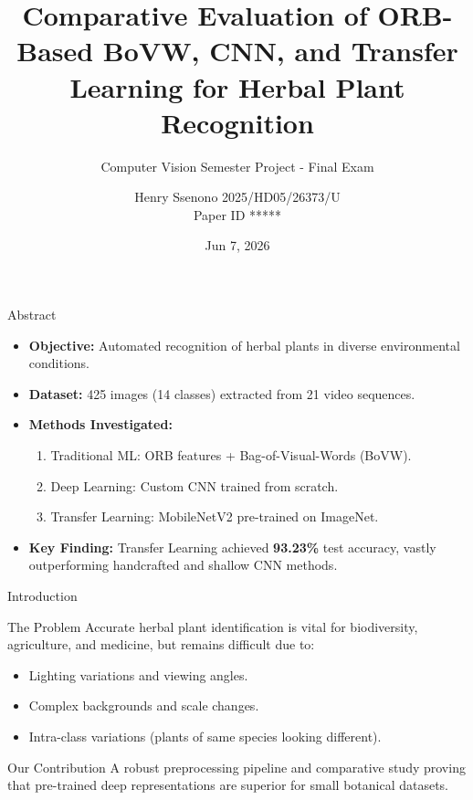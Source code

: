 \documentclass[10pt]{beamer}
\title[Herbal Plant Classification]{Comparative Evaluation of ORB-Based BoVW, CNN, and Transfer Learning for Herbal Plant Recognition}
\subtitle{Computer Vision Semester Project - Final Exam}
\author[Henry Ssenono]{Henry Ssenono 2025/HD05/26373/U \\ \small{Paper ID *****}}
\date[CVPR 2026]{Jun 7, 2026}
\begin{document}
\begin{frame}
    \titlepage
\end{frame}

\begin{frame}{Abstract}
    \begin{itemize}
        \item \textbf{Objective:} Automated recognition of herbal plants in diverse environmental conditions.
        \item \textbf{Dataset:} 425 images (14 classes) extracted from 21 video sequences.
        \item \textbf{Methods Investigated:}
            \begin{enumerate}
                \item Traditional ML: ORB features + Bag-of-Visual-Words (BoVW).
                \item Deep Learning: Custom CNN trained from scratch.
                \item Transfer Learning: MobileNetV2 pre-trained on ImageNet.
            \end{enumerate}
        \item \textbf{Key Finding:} Transfer Learning achieved \textbf{93.23\%} test accuracy, vastly outperforming handcrafted and shallow CNN methods.
    \end{itemize}
\end{frame}

\begin{frame}{Introduction}
    \begin{block}{The Problem}
        Accurate herbal plant identification is vital for biodiversity, agriculture, and medicine, but remains difficult due to:
    \end{block}
    \begin{itemize}
        \item Lighting variations and viewing angles.
        \item Complex backgrounds and scale changes.
        \item Intra-class variations (plants of same species looking different).
    \end{itemize}
    \begin{block}{Our Contribution}
        A robust preprocessing pipeline and comparative study proving that pre-trained deep representations are superior for small botanical datasets.
    \end{block}
\end{frame}
\end{document}
